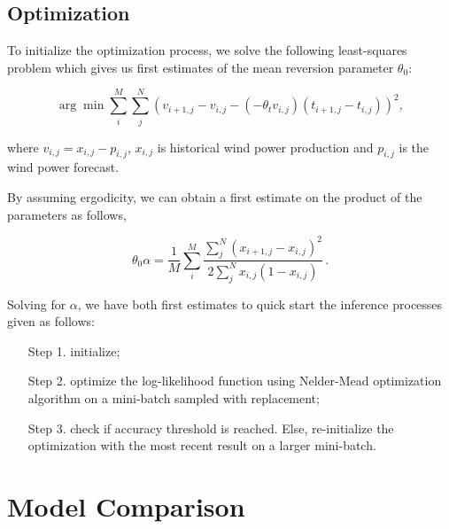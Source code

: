 \documentclass[11pt,english]{article}
\begin{document}
\subsection{Optimization}

To initialize the optimization process, we solve the following least-squares problem which gives us first estimates of the mean reversion parameter $\theta_0$:

\begin{equation}
 \arg\min \sum\limits_{i}^M \sum\limits_j^N \left( v_{i+1,j}  - v_{i,j}- \left( - \theta_t v_{i,j}\right) \left(t_{i+1,j} - t_{i,j} \right)  \right)^2 ,
 \end{equation}
 
 where $v_{i,j}=x_{i,j}-p_{i,j}$,  $x_{i,j}$ is historical wind power production and $p_{i,j}$ is the wind power forecast.
 
 By assuming ergodicity, we can obtain a first estimate on the product of the parameters as follows,
 
\begin{equation}
\theta_0 \alpha = \frac{1}{M} \sum\limits_i^M \frac{ \sum\limits_j^N (x_{i+1,j}  - x_{i,j})^2}{2 \sum\limits_j^N x_{i,j}(1-x_{i,j}) } \,.
\end{equation}

Solving for $\alpha$, we have both first estimates to quick start the inference processes given as follows:
\begin{enumerate}
\item[Step 1.]  initialize;
\item[Step 2.]  optimize the log-likelihood function using  Nelder-Mead optimization algorithm on a mini-batch sampled with replacement;
\item[Step 3.] check if  accuracy threshold is reached. Else, re-initialize the optimization with the most recent result on a larger mini-batch.
\end{enumerate}

\section{Model Comparison} \label{Section_5}
\end{document}
